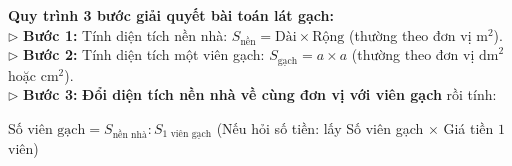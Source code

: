 \documentclass[14pt,a4paper,oneside]{extbook}
\begin{document}
\vspace{3mm}

\noindent
\begin{tcolorbox}[
  enhanced,
  title={\footnotesize\bfseries\color{white}\faHome\ 3. Bài toán thực tế kinh điển: Tính số viên gạch lát nền},
  colback=purple!2!white,
  colframe=purple!70!black,
  arc=2.5mm, boxrule=0.8pt, top=1.8mm, bottom=1.8mm, left=2.5mm, right=2.5mm
]
  \footnotesize
  \textbf{Quy trình 3 bước giải quyết bài toán lát gạch:}\\
  $\triangleright$ \textbf{Bước 1:} Tính diện tích nền nhà: $S_{\text{nền}} = \text{Dài} \times \text{Rộng}$ (thường theo đơn vị $\text{m}^2$).\\
  $\triangleright$ \textbf{Bước 2:} Tính diện tích một viên gạch: $S_{\text{gạch}} = a \times a$ (thường theo đơn vị $\text{dm}^2$ hoặc $\text{cm}^2$).\\
  $\triangleright$ \textbf{Bước 3:} \textbf{Đổi diện tích nền nhà về cùng đơn vị với viên gạch} rồi tính:\\
  \begin{tcolorbox}[colback=white, colframe=purple!70!black, boxrule=0.6pt, arc=1.5mm, halign=center, top=1mm, bottom=1mm]
    {\scriptsize\bfseries\color{purple!90!black}$\text{Số viên gạch} = S_{\text{nền nhà}} : S_{1\text{ viên gạch}}$} \quad (Nếu hỏi số tiền: lấy Số viên gạch $\times$ Giá tiền $1$ viên)
  \end{tcolorbox}
\end{tcolorbox}

\vspace{3mm}
\end{document}

